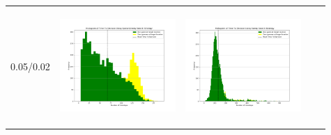 \begin{landscape}
\begin{table}[h!]
\begin{tabular}{ | c | c | c | c | c |}
    0.05/0.02 & \vline
    \begin{minipage}[c][45mm][c]{45mm}
      \includegraphics[width=44mm, height=44mm]{Chapters/MultiAgentTargetDetection/Figs/Histograms/MiscalibratedSensor/05-02/05-02EpsilonGreedyHistogram.png}
    \end{minipage}
    &
    \begin{minipage}[c][45mm][c]{45mm}
      \includegraphics[width=44mm, height=44mm]{Chapters/MultiAgentTargetDetection/Figs/Histograms/MiscalibratedSensor/05-02/05-02SweepHistogram.png}


\end{minipage}
\end{tabular}
\end{table}
\end{landscape}

